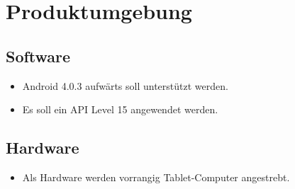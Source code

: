 \section{Produktumgebung}

\subsection{Software}
\begin{itemize}
	\item Android 4.0.3 aufwärts soll unterstützt werden.
	\item Es soll ein API Level 15 angewendet werden.
\end{itemize}
\subsection{Hardware}
\begin{itemize}
	\item Als Hardware werden vorrangig Tablet-Computer angestrebt.
\end{itemize}
